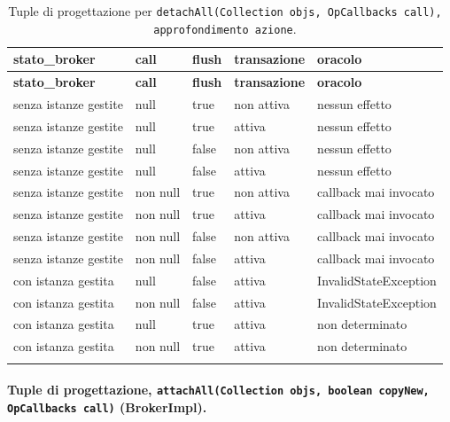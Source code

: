 {\footnotesize\setlength{\tabcolsep}{3pt}
\begin{longtable}{>{\raggedright\arraybackslash}p{}>{\raggedright\arraybackslash}p{}>{\raggedright\arraybackslash}p{}>{\raggedright\arraybackslash}p{}>{\raggedright\arraybackslash}p{}}
\toprule
\textbf{stato\_broker} & \textbf{call} & \textbf{flush} & \textbf{transazione} & \textbf{oracolo} \\
\midrule
\endfirsthead
\toprule
\textbf{stato\_broker} & \textbf{call} & \textbf{flush} & \textbf{transazione} & \textbf{oracolo} \\
\midrule
\endhead
\bottomrule
\endfoot
senza istanze gestite & null & true & non attiva & nessun effetto \\
senza istanze gestite & null & true & attiva & nessun effetto \\
senza istanze gestite & null & false & non attiva & nessun effetto \\
senza istanze gestite & null & false & attiva & nessun effetto \\
senza istanze gestite & non null & true & non attiva & callback mai invocato \\
senza istanze gestite & non null & true & attiva & callback mai invocato \\
senza istanze gestite & non null & false & non attiva & callback mai invocato \\
senza istanze gestite & non null & false & attiva & callback mai invocato \\
con istanza gestita & null & false & attiva & InvalidStateException \\
con istanza gestita & non null & false & attiva & InvalidStateException \\
con istanza gestita & null & true & attiva & non determinato \\
con istanza gestita & non null & true & attiva & non determinato \\
\bottomrule
\caption{Tuple di progettazione per \texttt{detachAll(Collection objs, OpCallbacks call), approfondimento azione}.}
\label{tab:detachall2-tuple}
\end{longtable}
}



\paragraph*{Tuple di progettazione, \texttt{attachAll(Collection objs, boolean copyNew, OpCallbacks call)} (BrokerImpl).}

